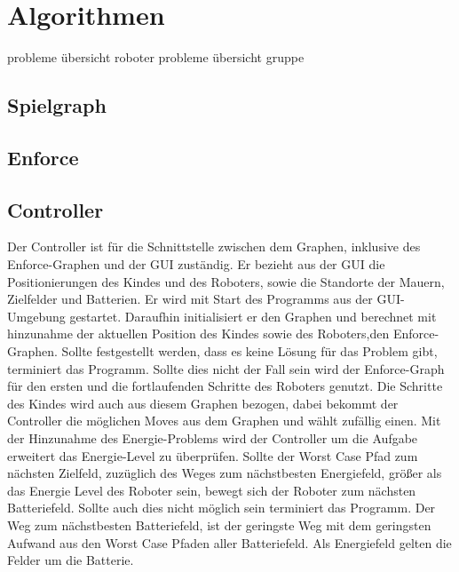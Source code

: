 \section{Algorithmen}
probleme übersicht roboter
probleme übersicht gruppe
\subsection{Spielgraph}
\subsection{Enforce}
\subsection{Controller}
Der Controller ist für die Schnittstelle zwischen dem Graphen, inklusive des Enforce-Graphen und der GUI zuständig. Er bezieht aus der GUI die Positionierungen des Kindes und des Roboters, sowie die Standorte der Mauern, Zielfelder und Batterien. Er wird mit Start des Programms aus der GUI-Umgebung gestartet. Daraufhin initialisiert er den Graphen und berechnet mit hinzunahme der aktuellen Position des Kindes sowie des Roboters,den Enforce-Graphen. Sollte festgestellt werden, dass es keine Lösung für das Problem gibt, terminiert das Programm. Sollte dies nicht der Fall sein wird der Enforce-Graph für den ersten und die fortlaufenden Schritte des Roboters genutzt. Die Schritte des Kindes wird auch aus diesem Graphen bezogen, dabei bekommt der Controller die möglichen Moves aus dem Graphen und wählt zufällig einen. Mit der Hinzunahme des Energie-Problems wird der Controller um die Aufgabe erweitert das Energie-Level zu überprüfen. Sollte der Worst Case Pfad zum nächsten Zielfeld, zuzüglich des Weges zum nächstbesten Energiefeld, größer als das Energie Level des Roboter sein, bewegt sich der Roboter zum nächsten Batteriefeld. Sollte auch dies nicht möglich sein terminiert das Programm. Der Weg zum nächstbesten Batteriefeld, ist der geringste Weg mit dem geringsten Aufwand aus den Worst Case Pfaden aller Batteriefeld. Als Energiefeld gelten die Felder um die Batterie.


%
